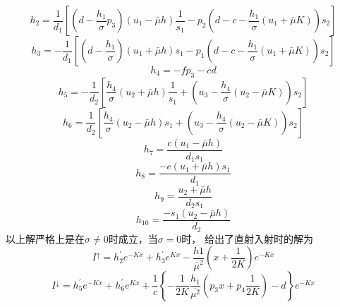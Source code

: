 \begin{equation}
h_{2}=\frac{1}{d_{1}}\left[\left(d-\frac{h_{1}}{\sigma} p_{3}\right)\left(u_{1}-\bar{\mu} h\right) 
\frac{1}{s_{1}}-p_{2}\left(d-c-\frac{h_{1}}{\sigma}\left(u_{1}+\bar{\mu} K\right)\right) s_{2}\right]
\end{equation}
\begin{equation}
h_{3}=-\frac{1}{d_{1}}\left[\left(d-\frac{h_{1}}{\sigma}\right)\left(u_{1}+\bar{\mu} h\right) 
s_{1}-p_{1}\left(d-c-\frac{h_{1}}{\sigma}\left(u_{1}+\bar{\mu} K\right)\right) s_{2}\right]
\end{equation}
\begin{equation}
h_{4}=-f p_{3}-c d
\end{equation}
\begin{equation}
h_{5}=-\frac{1}{d_{2}}\left[\frac{h_{4}}{\sigma}\left(u_{2}+\bar{\mu} h\right) 
\frac{1}{s_{1}}+\left(u_{3}-\frac{h_{4}}{\sigma}\left(u_{2}-\bar{\mu} K\right)\right) s_{2}\right]
\end{equation}
\begin{equation}
h_{6}=\frac{1}{d_{2}}\left[\frac{h_{4}}{\sigma}\left(u_{2}-\bar{\mu} h\right) 
s_{1}+\left(u_{3}-\frac{h_{4}}{\sigma}\left(u_{2}-\bar{\mu} K\right)\right) s_{2}\right]
\end{equation}
\begin{equation}
h_{7}=\frac{c\left(u_{1}-\bar{\mu} h\right)}{d_{1} s_{1}}
\end{equation}
\begin{equation}
h_{8}=\frac{-c\left(u_{1}+\bar{\mu} h\right) s_{1}}{d_{1}}
\end{equation}
\begin{equation}
h_{9}=\frac{u_{2}+\bar{\mu} h}{d_{2} s_{1}}
\end{equation}
\begin{equation}
h_{10}=\frac{-s_{1}\left(u_{2}-\bar{\mu} h\right)}{d_{2}}
\end{equation}
以上解严格上是在$\sigma \neq 0$时成立，当$\sigma = 0$时，\citet{dai2004two} 给出了直射入射时的解为
\begin{equation}
I^{\uparrow}=h_{2}^{\prime} e^{-K x}+h_{3}^{\prime} e^{K x}-\frac{h 1}{\bar{\mu}^{2}}\left(x+\frac{1}{2 K}\right) e^{-K x}
\end{equation}
\begin{equation}
I^{\downarrow}=h_{5}^{\prime} e^{-K x}+h_{6}^{\prime} e^{K x}+\frac{1}{c}\left\{-\frac{1}{2 K}
 \frac{h_{1}}{\overline{\mu^{2}}}\left(p_{3} x+p_{4} \frac{1}{2 K}\right)-d\right\} e^{-K x}
\end{equation}
